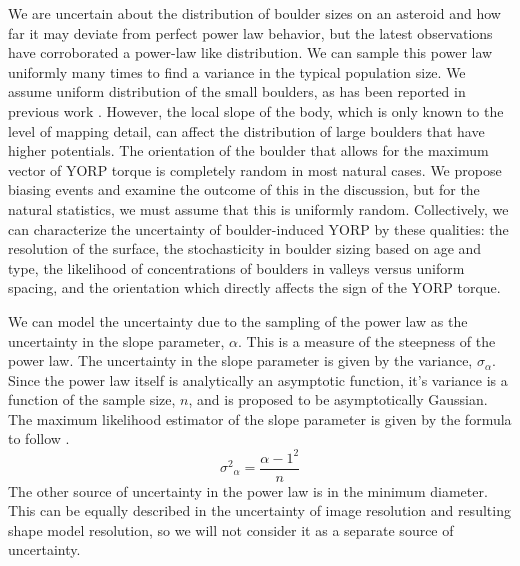 We are uncertain about the distribution of boulder sizes on an asteroid and how far it may deviate from perfect power law behavior, but the latest observations have corroborated a power-law like distribution. We can sample this power law uniformly many times to find a variance in the typical population size. We assume uniform distribution of the small boulders, as has been reported in previous work \citep{DellaGiustina2019}. However, the local slope of the body, which is only known to the level of mapping detail, can affect the distribution of large boulders that have higher potentials. The orientation of the boulder that allows for the maximum vector of YORP torque is completely random in most natural cases. We propose biasing events and examine the outcome of this in the discussion, but for the natural statistics, we must assume that this is uniformly random. Collectively, we can characterize the uncertainty of boulder-induced YORP by these qualities: the resolution of the surface, the stochasticity in boulder sizing based on age and type, the likelihood of concentrations of boulders in valleys versus uniform spacing, and the orientation which directly affects the sign of the YORP torque. 

We can model the uncertainty due to the sampling of the power law as the uncertainty in the slope parameter, $\alpha$. This is a measure of the steepness of the power law. The uncertainty in the slope parameter is given by the variance, $\sigma_{\alpha}$. Since the power law itself is analytically an asymptotic function, it's variance is a function of the sample size, $n$, and is proposed to be asymptotically Gaussian. The maximum likelihood estimator of the slope parameter is given by the formula to follow \citep{Clauset2009}.  
\begin{equation}
    {\sigma^2}_{\alpha} = \frac{{\alpha-1}^2}{n}
\end{equation}
The other source of uncertainty in the power law is in the minimum diameter. This can be equally described in the uncertainty of image resolution and resulting shape model resolution, so we will not consider it as a separate source of uncertainty.

